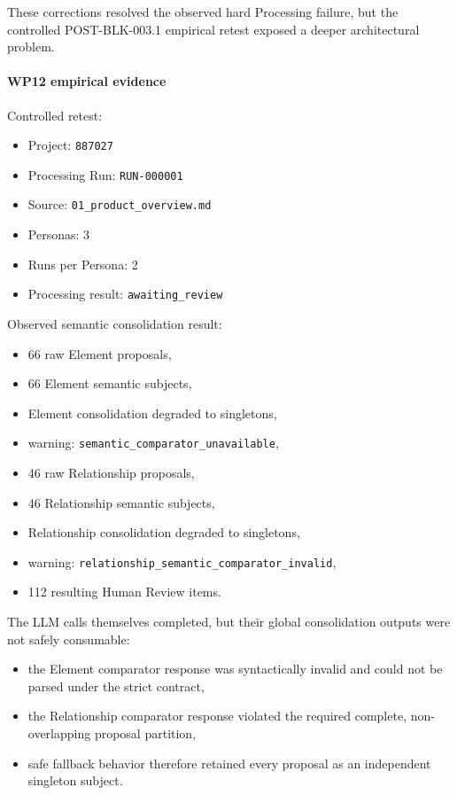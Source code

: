 These corrections resolved the observed hard Processing failure, but the controlled POST-BLK-003.1 empirical retest exposed a deeper architectural problem.

\hypertarget{wp12-empirical-evidence}{%
\paragraph{WP12 empirical evidence}\label{wp12-empirical-evidence}}

Controlled retest:

\begin{itemize}
\tightlist
\item
  Project: \texttt{887027}
\item
  Processing Run: \texttt{RUN-000001}
\item
  Source: \texttt{01\_product\_overview.md}
\item
  Personas: 3
\item
  Runs per Persona: 2
\item
  Processing result: \texttt{awaiting\_review}
\end{itemize}

Observed semantic consolidation result:

\begin{itemize}
\tightlist
\item
  66 raw Element proposals,
\item
  66 Element semantic subjects,
\item
  Element consolidation degraded to singletons,
\item
  warning: \texttt{semantic\_comparator\_unavailable},
\item
  46 raw Relationship proposals,
\item
  46 Relationship semantic subjects,
\item
  Relationship consolidation degraded to singletons,
\item
  warning: \texttt{relationship\_semantic\_comparator\_invalid},
\item
  112 resulting Human Review items.
\end{itemize}

The LLM calls themselves completed, but their global consolidation outputs were not safely consumable:

\begin{itemize}
\tightlist
\item
  the Element comparator response was syntactically invalid and could not be parsed under the strict contract,
\item
  the Relationship comparator response violated the required complete, non-overlapping proposal partition,
\item
  safe fallback behavior therefore retained every proposal as an independent singleton subject.
\end{itemize}

